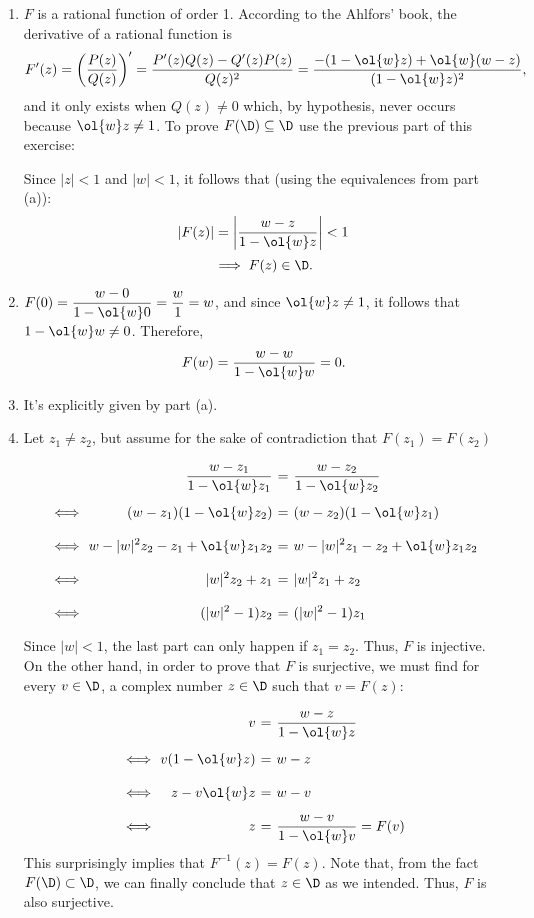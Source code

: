 \begin{enumerate}[label=(\roman*)]
    \item $F$ is a rational function of order 1. According to the Ahlfors' book, the derivative of a rational function is
    \[ F'(z) = \left( \frac{P(z)}{Q(z)} \right)' = \frac{P'(z)Q(z)-Q'(z)P(z)}{Q(z)^2} = \frac{-(1-\ol{w}z) + \ol{w}(w-z) }{(1-\ol{w}z)^2}, \]
    and it only exists when $Q(z) \neq 0$ which, by hypothesis, never occurs because $\ol{w}z \neq 1$. To prove $F(\D) \subseteq \D$ use the previous part of this exercise:

    Since $|z| < 1$ and $|w| < 1$, it follows that (using the equivalences from part (a)):
    \[ |F(z)| = \left| \frac{w-z}{1-\ol{w}z} \right| < 1 \]
    \[ \implies F(z) \in \D. \]
    \item $F(0) = \dfrac{w-0}{1-\ol{w}0} = \dfrac{w}{1} = w$, and since $\ol{w}z \neq 1$, it follows that $1-\ol{w}w \neq 0$. Therefore,
    \[ F(w) = \frac{w-w}{1-\ol{w}w} = 0. \]
    \item It's explicitly given by part (a).
    \item Let $z_1 \neq z_2$, but assume for the sake of contradiction that $F(z_1) = F(z_2)$
    \[  \]
    \[ 
    \everymath{\displaystyle}
    \arraycolsep=1.8pt\def\arraystretch{2}
    \begin{array}{rrcl}
        & \frac{w-z_1}{1-\ol{w}z_1} & = & \frac{w-z_2}{1-\ol{w}z_2}\\
        \iff & (w-z_1)(1-\ol{w}z_2) & = & (w-z_2)(1-\ol{w}z_1) \\
        \iff & w-|w|^2z_2 - z_1 + \ol{w}z_1z_2 & = & w-|w|^2z_1 - z_2 + \ol{w}z_1z_2 \\
        \iff & |w|^2z_2 + z_1 & = & |w|^2z_1 + z_2\\
        \iff & (|w|^2 -1) z_2  & = & (|w|^2 -1) z_1\\
    \end{array}
    \]
    Since $|w| < 1$, the last part can only happen if $z_1 = z_2$. Thus, $F$ is injective. On the other hand, in order to prove that $F$ is surjective, we must find for every $v \in \D$, a complex number $z\in \D$ such that $v = F(z)$:
    \[ 
    \everymath{\displaystyle}
    \arraycolsep=1.8pt\def\arraystretch{2}
    \begin{array}{rrcl}
        & v & = & \frac{w-z}{1-\ol{w}z}\\
        \iff & v(1-\ol{w}z) & = & w-z\\
        \iff & z-v\ol{w}z & = & w-v\\
        \iff & z & = & \frac{w-v}{1-\ol{w}v} = F(v)
    \end{array}
    \]
    This surprisingly implies that $F^{-1}(z) = F(z)$. Note that, from the fact $F(\D) \subset \D$, we can finally conclude that $z \in \D$ as we intended. Thus, $F$ is also surjective.
\end{enumerate}



